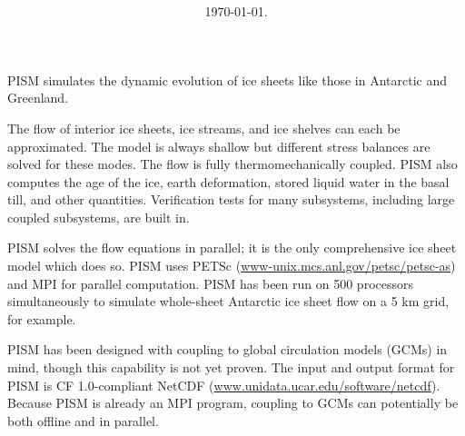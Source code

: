 \documentclass[12pt,final]{amsart}
\title[]{\protect{\large Parallel Ice Sheet Model (PISM):\normalsize} \\ \protect{\large\medskip A Summary\normalsize}}
\date{\today.}
\newcommand{\tablespacing}{\renewcommand{\baselinestretch}{1.0}\tiny\normalsize}
\begin{document}
\maketitle
\thispagestyle{empty}

PISM simulates the dynamic evolution of ice sheets like those in Antarctic and Greenland.

The flow of interior ice sheets, ice streams, and ice shelves can each be approximated.  The model is always shallow but different stress balances are solved for these modes.  The flow is fully thermomechanically coupled.  PISM also computes the age of the ice, earth deformation, stored liquid water in the basal till, and other quantities.   Verification tests for many subsystems, including large coupled subsystems, are built in.

PISM solves the flow equations in parallel; it is the only comprehensive ice sheet model which does so.  PISM uses PETSc (\href{http://www-unix.mcs.anl.gov/petsc/petsc-as/}{www-unix.mcs.anl.gov/petsc/petsc-as}) and MPI for parallel computation.  PISM has been run on 500 processors simultaneously to simulate whole-sheet Antarctic ice sheet flow on a 5 km grid, for example.

PISM has been designed with coupling to global circulation models (GCMs) in mind, though this capability is not yet proven.  The input and output format for PISM is CF 1.0-compliant NetCDF (\href{http://www.unidata.ucar.edu/software/netcdf/}{www.unidata.ucar.edu/software/netcdf}).  Because PISM is already an MPI program, coupling to GCMs can potentially be both offline and in parallel.
\end{document}
